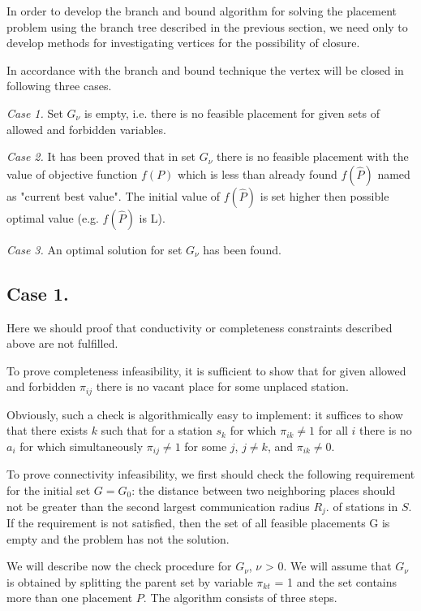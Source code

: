 In order to develop the branch and bound algorithm for solving the placement problem using the branch tree described in the previous section, we need only to develop methods for investigating vertices for the possibility of closure.  
  
In accordance with the branch and bound technique the vertex will be closed in following three cases. 

\textit{Case 1.} Set $G_\nu$ is empty, i.e. there is no feasible placement for given sets of allowed and forbidden variables.

\textit{Case 2.} It has been proved that in set $G_\nu$ there is no feasible placement with the value of objective function $f(P)$ which is less than already found $f(\widehat{P})$ named as "current best value". The initial value of $f(\widehat{P})$ is set higher then possible optimal value (e.g.  $f(\widehat{P})$ is L).

\textit{Case 3.} An optimal solution for set $G_\nu$ has been found.

\subsection{Case 1.}
Here we should proof that conductivity or completeness constraints described above are not fulfilled.

To prove completeness infeasibility, it is sufficient to show that for given allowed and forbidden $\pi_{ij}$ there is no vacant place for some unplaced station.  

Obviously, such a check is algorithmically easy to implement: it suffices to show that there exists $k$ such that for a station $s_{k}$ for which $\pi_{ik} \neq 1$ for all $i$ there is no $a_i$ for which simultaneously $\pi_{ij}
 \neq 1$  for some $j$, $j \neq k$, and $\pi_{ik} \neq 0$.

To prove connectivity infeasibility, we first should check the following requirement for the initial set $G = G_0$: the distance between two neighboring places should not be greater than the second largest communication radius $R_j$. of stations in $S$. If the requirement is not satisfied, then the set of all feasible placements G is empty and the problem has not the solution.

We will describe now the check procedure for $G_\nu$, $\nu$ > 0. We will assume that $G_\nu$ is obtained by splitting the parent set by variable $\pi_{kt}$ = 1 and the set contains more than one placement $P$. The algorithm consists of three steps.

